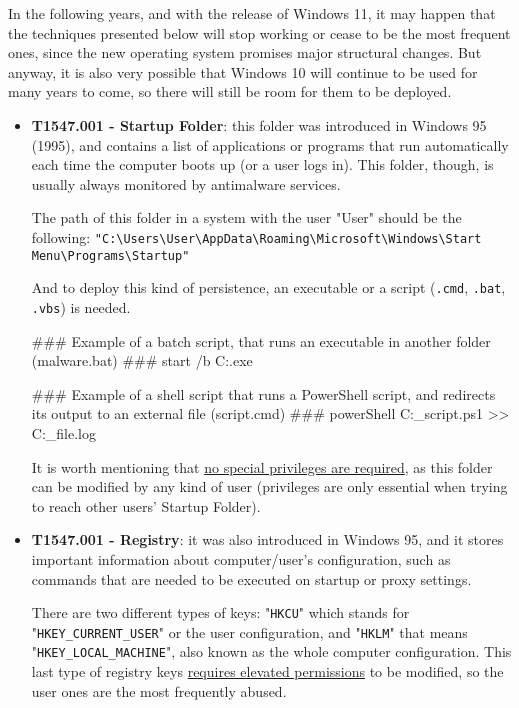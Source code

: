 In the following years, and with the release of Windows 11, it may happen that the techniques presented below will stop working or cease to be the most frequent ones, since the new operating system promises major structural changes. But anyway, it is also very possible that Windows 10 will continue to be used for many years to come, so there will still be room for them to be deployed.

\pagebreak
\begin{itemize}
\item \textbf{T1547.001 - Startup Folder}: this folder was introduced in Windows 95 (1995), and contains a list of applications or programs that run automatically each time the computer boots up (or a user logs in). This folder, though, is usually always monitored by antimalware services.

The path of this folder in a system with the user "User" should be the following: \verb|"C:\Users\User\AppData\Roaming\Microsoft\Windows\Start Menu\Programs\Startup"|

And to deploy this kind of persistence, an executable or a script (\texttt{.cmd}, \texttt{.bat}, \texttt{.vbs}) is needed. 
\vspace{7pt}
\begin{spverbatim}
### Example of a batch script, that runs an executable in another folder (malware.bat) ###
start /b C:\Users\User\AppData\Local\Temp\malware.exe

### Example of a shell script that runs a PowerShell script, and redirects its output to an external file (script.cmd) ###
powerShell C:\Users\User\powershell_script.ps1 >> C:\Users\User\log_file.log
\end{spverbatim}

\vspace{10pt}
It is worth mentioning that \underline{no special privileges are required}, as this folder can be modified by any kind of user (privileges are only essential when trying to reach other users' Startup Folder).\\

\item \textbf{T1547.001 - Registry}: it was also introduced in Windows 95, and it stores important information about computer/user's configuration, such as commands that are needed to be executed on startup or proxy settings.

There are two different types of keys: "\texttt{HKCU}" which stands for "\texttt{HKEY\_CURRENT\_USER}" or the user configuration, and "\texttt{HKLM}" that means "\texttt{HKEY\_LOCAL\_MACHINE}", also known as the whole computer configuration. This last type of registry keys \underline{requires elevated permissions} to be modified, so the user ones are the most frequently abused. 


\end{itemize}
